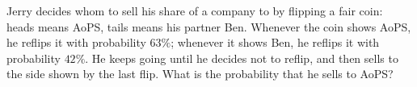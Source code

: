 Jerry decides whom to sell his share of a company to by flipping a fair coin: heads means AoPS, tails means his partner Ben. Whenever the coin shows AoPS, he reflips it with probability $63\%$; whenever it shows Ben, he reflips it with probability $42\%$. He keeps going until he decides not to reflip, and then sells to the side shown by the last flip. What is the probability that he sells to AoPS?
